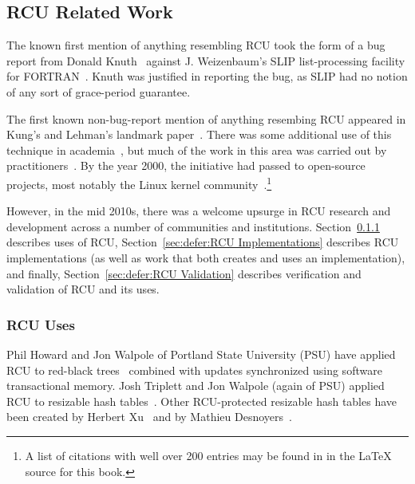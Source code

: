 
\subsection{RCU Related Work}
\label{sec:defer:RCU Related Work}

The known first mention of anything resembling RCU took the form of a bug
report from
Donald Knuth~\cite[page 413 of Fundamental Algorithms]{Knuth73}
against J. Weizenbaum's SLIP list-processing facility for
FORTRAN~\cite{Weizenbaum:1963:SLP:367593.367617}.
Knuth was justified in reporting the bug, as SLIP had no notion of
any sort of grace-period guarantee.

The first known non-bug-report mention of anything resembing RCU appeared
in Kung's and Lehman's landmark paper~\cite{Kung80}.
There was some additional use of this technique in
academia~\cite{Manber82,Manber84,BarbaraLiskov1988ArgusCACM,Pugh90,Andrews91textbook,Pu95a,Cowan96a,Rastogi:1997:LPV:645923.671017,Gamsa99},
but much of the work in this area was carried out by
practitioners~\cite{RichardRashid87a,Hennessy89,Jacobson93,AjuJohn95,Slingwine95,Slingwine97,Slingwine98,McKenney98}.
By the year 2000, the initiative had passed to open-source projects,
most notably the Linux kernel
community~\cite{RustyRussell2000a,RustyRussell2000b,McKenney01b,McKenney01a,McKenney02a,Arcangeli03}.\footnote{
	A list of citations with well over 200 entries may be found in
	 in the {\LaTeX} source for this book.}

However, in the mid 2010s, there was a welcome upsurge in RCU research
and development across a number of communities and institutions.
Section~\ref{sec:defer:RCU Uses} describes uses of RCU,
Section~\ref{sec:defer:RCU Implementations} describes RCU implementations
(as well as work that both creates and uses an implementation),
and finally,
Section~\ref{sec:defer:RCU Validation} describes verification and validation
of RCU and its uses.

\subsubsection{RCU Uses}
\label{sec:defer:RCU Uses}

Phil Howard and Jon Walpole of Portland State University (PSU) have
applied RCU to red-black
trees~\cite{PhilHowardPhD,PhilHoward2011RCUTMRBTree} combined with updates
synchronized using software transactional memory.
Josh Triplett and Jon Walpole (again of PSU) applied RCU to resizable
hash tables~\cite{JoshTriplettPhD,Triplett:2011:RPHash,JonCorbet2014RCUhash1,JonCorbet2014RCUhash2}.
Other RCU-protected resizable hash tables have been created by
Herbert Xu~\cite{HerbertXu2010RCUResizeHash} and by
Mathieu Desnoyers~\cite{PaulMcKenney2013LWNURCUhash}.

